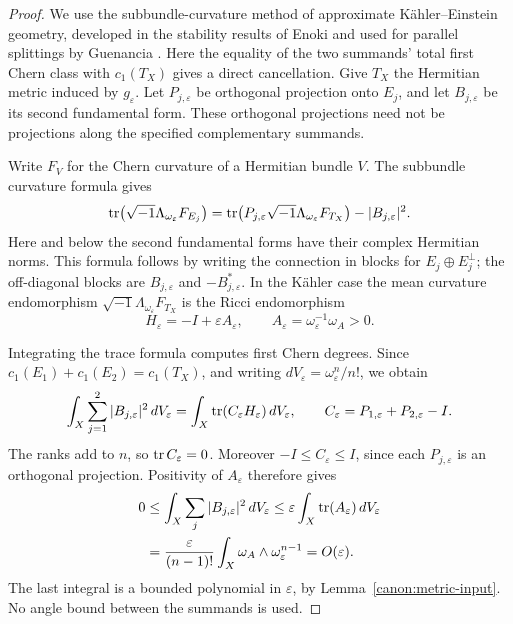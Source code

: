 \begin{proof}
We use the subbundle-curvature method of approximate
K\"ahler--Einstein geometry, developed in the stability results of
Enoki \cite{Enoki88} and used for parallel splittings by Guenancia
\cite[Section~3.4, Step~4, Equations~(3.12)--(3.13)]{Guenancia16}.
Here the equality of the two summands' total first Chern class with
$c_1(T_X)$ gives a direct cancellation.
Give \(T_X\) the Hermitian metric induced by \(g_\varepsilon\).
Let \(P_{j,\varepsilon}\) be orthogonal projection onto \(E_j\),
and let \(B_{j,\varepsilon}\) be its second fundamental form.
These orthogonal projections need not be projections along the
specified complementary summands.

Write \(F_{V}\) for the Chern curvature of a Hermitian bundle \(V\).
The subbundle curvature formula gives
\[
 \operatorname{tr}\!\left(\sqrt{-1}\Lambda_{\omega_\varepsilon}F_{E_j}\right)
 =
 \operatorname{tr}\!\left(
   P_{j,\varepsilon}\sqrt{-1}\Lambda_{\omega_\varepsilon}F_{T_X}
 \right)-|B_{j,\varepsilon}|^2.
\]
Here and below the second fundamental forms have their complex
Hermitian norms.  This formula follows by writing the connection in
blocks for \(E_j\oplus E_j^\perp\); the off-diagonal blocks are
\(B_{j,\varepsilon}\) and \(-B_{j,\varepsilon}^*\).
In the Kähler case the mean curvature endomorphism
\(\sqrt{-1}\Lambda_{\omega_\varepsilon}F_{T_X}\) is the Ricci
endomorphism
\[
 H_\varepsilon=-I+\varepsilon A_\varepsilon,
 \qquad A_\varepsilon=\omega_\varepsilon^{-1}\omega_A>0.
\]

Integrating the trace formula computes first Chern degrees.
Since \(c_1(E_1)+c_1(E_2)=c_1(T_X)\), and writing
\(dV_\varepsilon=\omega_\varepsilon^n/n!\), we obtain
\[
 \int_X\sum_{j=1}^2|B_{j,\varepsilon}|^2\,dV_\varepsilon
 =
 \int_X\operatorname{tr}(C_\varepsilon H_\varepsilon)\,dV_\varepsilon,
 \qquad
 C_\varepsilon=P_{1,\varepsilon}+P_{2,\varepsilon}-I.
\]
The ranks add to \(n\), so \(\operatorname{tr} C_\varepsilon=0\).
Moreover \(-I\leq C_\varepsilon\leq I\), since each
\(P_{j,\varepsilon}\) is an orthogonal projection.  Positivity of
\(A_\varepsilon\) therefore gives
\begin{align}
 0
 &\leq\int_X\sum_j|B_{j,\varepsilon}|^2\,dV_\varepsilon
 \leq\varepsilon\int_X\operatorname{tr}(A_\varepsilon)\,dV_\varepsilon
 \notag\\
 &=\frac{\varepsilon}{(n-1)!}
       \int_X\omega_A\wedge\omega_\varepsilon^{n-1}
   =O(\varepsilon).
 \label{canon:energy}
\end{align}
The last integral is a bounded polynomial in \(\varepsilon\), by
Lemma~\ref{canon:metric-input}.  No angle bound between the summands
is used.


\end{proof}
